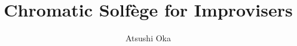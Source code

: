 \documentclass[a4paper]{article}
\title{Chromatic Solfège for Improvisers}
\author{Atsushi Oka}
\date{}
\def\slant#1#2{%
	\tikz[baseline=(X.base), xslant=tan(#1)]
	\node[inner sep=0pt, xslant=tan(#1)](X){#2};%
}
\def \caccidental#1{%
	\kern -0.70em \slant{15}{%
		\textsuperscript{ \scalebox{.9}{ #1 } }%
	}%
	\kern -0.40em %
}
\def \csharp {%
	\caccidental{ \sharp }%
}
\def \cflat{%
	\caccidental{ \flat  }%
}
\def \cnatural{%
	\caccidental{ \natural }%
}
\begin{document}
\maketitle

\begin{comment}

\begin{abstract}
	\textbf{\textit{ UNFINISHED 1 Apr 2018 }} \\
	
In modern music, many compositions are polymodal. In order to obtain better understanding for polymodality, let’s extend traditional diatonic solfège to chromatic. This article will explain a method to extend the traditional solfège into chromatic by introducing new note names which was invented by Aaron Shearer and show how to build fluency with the notes by enumerating all the irregular cases which the current diatonic based interval system consists.

\end{abstract}

~\\
~\\

\section{Introduction}

In the modern diatonic based interval system, there are certain missing intervals which do not exist without irregular accidentals such as double flat, double sharp, C\cflat , F\cflat. E\csharp and B\csharp. For example G\cflat does not have the perfect 4th interval without an irregular flatted note C\cflat.  Enharmonically speaking, C\cflat is B\cnatural; but harmonically speaking, B\cnatural from G\cflat is the augmented major 3rd rather than the perfect 4th. 

In modern music, most tunes are played in equal temperament. Especially in jazz music in 1980’s or later, the scales are premised equal temperament and players frequently modulate tonality of tunes. However, the music notation is still using the diatonic based interval system; therefore it is still necessary to go through the complication of the missing intervals.

In general, it is preferable to write intervals with harmonically correct name; for example, writing G\cflat major scale’s 4th note as C\cflat rather than B\cnatural is preferable because B\cnatural is not 4th but augmented major 3rd. In practical use,  However, harmonic correctness is often intentionally disregarded because it does not employ how to play it on musical instruments; therefore it is also very common to write C\cflat as B\cnatural in this case. The modern musical instruments are based on equal temperament; in spite of the note that a player should play is harmonically C\cflat, the player has to manipulate their instrument as if the note is B\cnatural.


\end{comment}
\end{document}
